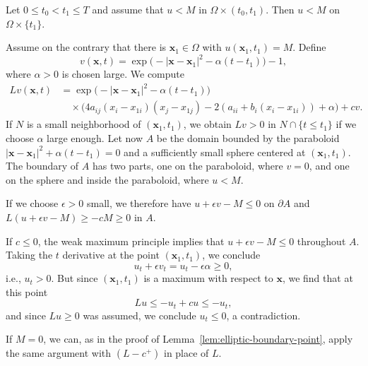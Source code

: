 \begin{Lemma}
\label{lem:parabolic-time-strictness}
Let $0\leq t_0<t_1\leq T$ and assume that $u<M$ in $\Omega\times(t_0,t_1)$. Then $u<M$ on $\Omega\times\{t_1\}$.
\end{Lemma}

\begin{Proof}
Assume on the contrary that there is $\bm{x}_1\in\Omega$ with $u(\bm{x}_1,t_1)=M$. Define
\begin{equation}\label{eq:parabolic-time-propagation-barrier}
v(\bm{x},t)=\exp\bigl(-|\bm{x}-\bm{x}_1|^2-\alpha(t-t_1)\bigr)-1,
\end{equation}
where $\alpha>0$ is chosen large. We compute\[
\begin{aligned}
Lv(\bm{x},t)&=\exp\bigl(-|\bm{x}-\bm{x}_1|^2-\alpha(t-t_1)\bigr)\\
&\quad\times\bigl(4a_{ij}(x_i-x_{1i})(x_j-x_{1j})-2(a_{ii}+b_i(x_i-x_{1i}))+\alpha\bigr)+cv.
\end{aligned}
\]If $N$ is a small neighborhood of $(\bm{x}_1,t_1)$, we obtain $Lv>0$ in $N\cap\{t\leq t_1\}$ if we choose $\alpha$ large enough. Let now $A$ be the domain bounded by the paraboloid $|\bm{x}-\bm{x}_1|^2+\alpha(t-t_1)=0$ and a sufficiently small sphere centered at $(\bm{x}_1,t_1)$. The boundary of $A$ has two parts, one on the paraboloid, where $v=0$, and one on the sphere and inside the paraboloid, where $u<M$.

If we choose $\epsilon>0$ small, we therefore have $u+\epsilon v-M\leq0$ on $\partial A$ and $L(u+\epsilon v-M)\geq-cM\geq0$ in $A$.

If $c\leq0$, the weak maximum principle implies that $u+\epsilon v-M\leq0$ throughout $A$. Taking the $t$ derivative at the point $(\bm{x}_1,t_1)$, we conclude
\begin{equation}\label{eq:parabolic-terminal-time-derivative-bound}
u_t+\epsilon v_t=u_t-\epsilon\alpha\geq0,
\end{equation}
i.e., $u_t>0$. But since $(\bm{x}_1,t_1)$ is a maximum with respect to $\bm{x}$, we find that at this point
\begin{equation}\label{eq:parabolic-terminal-operator-bound}
Lu\leq-u_t+cu\leq-u_t,
\end{equation}
and since $Lu\geq0$ was assumed, we conclude $u_t\leq0$, a contradiction.

If $M=0$, we can, as in the proof of Lemma~\ref{lem:elliptic-boundary-point}, apply the same argument with $(L-c^+)$ in place of $L$.
\end{Proof}


